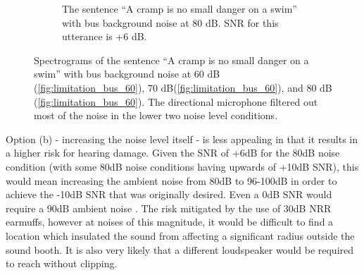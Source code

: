 \begin{figure}[h]
\begin{center}
\begin{subfigure}{0.475\textwidth}
  \caption{The sentence ``A cramp is no small danger on a swim'' with bus background noise at 80 dB. SNR for this utterance is +6 dB.}
  \label{fig:limitation_bus_80}
\end{subfigure}
\end{center}
\caption{Spectrograms of the sentence ``A cramp is no small danger on a swim'' with bus background noise at 60 dB (\ref{fig:limitation_bus_60}), 70 dB(\ref{fig:limitation_bus_60}), and 80 dB (\ref{fig:limitation_bus_60}). The directional microphone filtered out most of the noise in the lower two noise level conditions.}
\label{fig:noise_level_limitation}
\end{figure}

Option (b) - increasing the noise level itself - is less appealing in that it results in a higher risk for hearing damage\DIFaddbegin {}\DIFaddend .  Given the SNR of +6dB for the 80dB noise condition (with some 80dB noise conditions having upwards of +10dB SNR), this would mean increasing the ambient noise from 80dB to 96-100dB in order to achieve the -10dB SNR that was originally desired.  Even a 0dB SNR would require a \DIFaddbegin {}\DIFaddend 90dB ambient noise \DIFdelbegin {}\DIFdelend \DIFaddbegin {}\DIFaddend . The risk \DIFdelbegin {}\DIFdelend \DIFaddbegin {}\DIFaddend mitigated by the use of 30dB NRR earmuffs, however at noises of this magnitude, it would be difficult to find a location which insulated the sound from affecting a significant radius outside the sound booth.  It is also very likely that a different loudspeaker would be required to reach \DIFdelbegin {}\DIFdelend \DIFaddbegin {}\DIFaddend without clipping.

\DIFdelbegin %
\DIFdelend \DIFaddbegin {}\DIFaddend 

